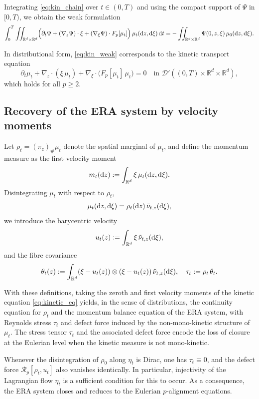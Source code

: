 \documentclass[10pt,reqno]{amsart}
\renewcommand{\ge}{\geqslant}
\numberwithin{equation}{section}
\newcommand{\R}{\mathbb R}
\newcommand{\bq}{\begin{equation}}
\newcommand{\eq}{\end{equation}}
\newcommand{\pa}{\partial}
\newcommand{\intr}{\int_{\R^d}}
\newcommand{\intrr}{\iint_{\R^d \times \R^d}}
\newcommand{\calD}{\mathcal D}
\newcommand{\calR}{\mathcal R}
\newcommand{\rd}{\textnormal{d}}
\newcommand{\dt}{\textnormal{d}t}
\newcommand{\dz}{\textnormal{d}z}
\begin{document}
Integrating \eqref{eq:kin_chain} over $t\in(0,T)$ and using the compact support of $\Psi$ in $[0,T)$, we obtain the weak formulation
\bq\label{eq:kin_weak}
\int_0^T\intrr \Bigl(\pa_t\Psi + (\nabla_z\Psi)\cdot \xi + (\nabla_\xi\Psi)\cdot F_p[\mu_t]\Bigr)\,\mu_t(\dz,\rd\xi)\,\dt
= -\intrr \Psi(0,z,\xi)\,\mu_0(\dz,\rd\xi).
\eq

In distributional form, \eqref{eq:kin_weak} corresponds to the kinetic transport equation
\bq\label{eq:kinetic_eq}
\pa_t\mu_t + \nabla_z\cdot(\xi\,\mu_t) + \nabla_\xi\cdot\bigl(F_p[\mu_t]\,\mu_t\bigr)=0
\quad \text{in }\calD'((0,T)\times\R^d\times\R^d),
\eq
which holds for all $p\ge2$.
%
%
%
%
%
%
\subsection{Recovery of the ERA system by velocity moments}

Let $\rho_t=(\pi_z)_\#\mu_t$ denote the spatial marginal of $\mu_t$, and define the momentum measure as the first velocity moment
\[
m_t(\dz):=\intr \xi\,\mu_t(\dz,\rd\xi).
\]
Disintegrating $\mu_t$ with respect to $\rho_t$,
\[
\mu_t(\dz,\rd\xi)=\rho_t(\dz)\,\tilde\nu_{t,z}(\rd\xi),
\]
we introduce the barycentric velocity
\[
u_t(z):=\intr \xi\,\tilde\nu_{t,z}(\rd\xi),
\]
and the fibre covariance
\[
\theta_t(z)
:=\intr (\xi-u_t(z))\otimes(\xi-u_t(z))\,\tilde\nu_{t,z}(\rd\xi),
\quad
\tau_t:=\rho_t\,\theta_t.
\]

With these definitions, taking the zeroth and first velocity moments of the kinetic equation \eqref{eq:kinetic_eq} yields, in the sense of distributions, the continuity equation for $\rho_t$ and the momentum balance equation of the ERA system, with Reynolds stress $\tau_t$ and defect force induced by the non-mono-kinetic structure of $\mu_t$. The stress tensor $\tau_t$ and the associated defect force encode the loss of closure at the Eulerian level when the kinetic measure is not mono-kinetic.

Whenever the disintegration of $\rho_0$ along $\eta_t$ is Dirac, one has $\tau_t\equiv0$, and the defect force $\calR_p[\rho_t,u_t]$ also vanishes identically. In particular, injectivity of the Lagrangian flow $\eta_t$ is a sufficient condition for this to occur. As a consequence, the ERA system closes and reduces to the Eulerian $p$-alignment equations.

 

%
%
%                      
%
%
 
\end{document}
